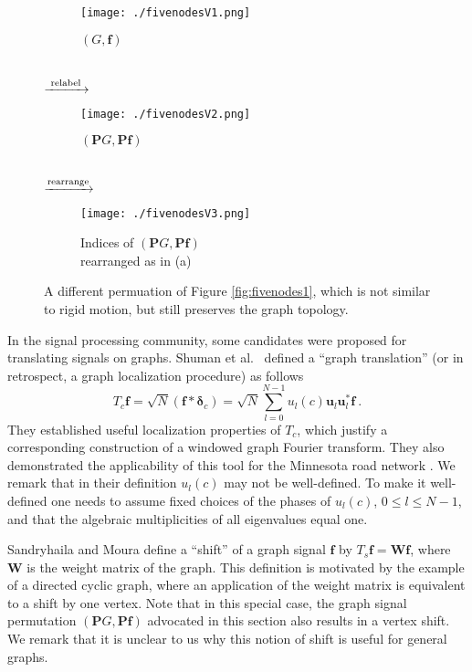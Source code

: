 \documentclass{article}
\def\BP{\boldsymbol{P}}
\def\BW{\boldsymbol{W}}
\def\Bf{\boldsymbol{f}}
\def\Bu{\boldsymbol{u}}
\begin{document}
\begin{figure}[!ht]
\centering
\begin{subfigure}{.25\textwidth}
	\centering
    \texttt{[image: ./fivenodesV1.png]}
    \caption{$(G, \Bf)$ \\ ~ }
\label{fig:fivenodesV1}
\end{subfigure}
{\large$\xrightarrow{\textup{~relabel~}}$}\begin{subfigure}{.25\textwidth}
	\centering
    \texttt{[image: ./fivenodesV2.png]}
    \caption{$(\BP G, \BP \Bf)$ \\ ~ }
\label{fig:fivenodesV2}
\end{subfigure}
{\large$\xrightarrow{\textup{rearrange}}$}\begin{subfigure}{.25\textwidth}
	\centering
    \texttt{[image: ./fivenodesV3.png]}
    \caption{Indices of $(\BP G, \BP \Bf)$ \\ rearranged as in (a)}
\label{fig:fivenodesV3}
\end{subfigure}
\caption{{A different permuation of Figure \ref{fig:fivenodes1}, which is not similar to rigid motion, but still preserves the graph topology.}}
\label{fig:fivenodesV}
\end{figure}


In the signal processing community, {some} candidates were proposed for translating signals on graphs. Shuman et al.~\cite{ShuRV16} {defined a ``graph translation'' (or in retrospect, a graph localization procedure) as follows} 
\begin{equation}\label{eq:defTranslMod}
T_c \Bf = \sqrt{N} (\Bf \ast \boldsymbol{\delta}_c) = \sqrt{N} \sum_{l=0}^{N-1} u_l(c) \Bu_l \Bu_l^* \Bf  ~.
\end{equation}
{They established useful localization properties of $T_c$, which justify a corresponding construction of a windowed graph Fourier transform. They also demonstrated the applicability of this tool for the Minnesota road network \cite[Figure 7]{ShuRV16}. 
We remark that in their definition $u_l(c)$ may not be well-defined. To make it well-defined one needs to assume fixed choices of the phases of $u_l(c)$, $0 \leq l \leq N-1$, and that the algebraic multiplicities of all eigenvalues equal one. }

Sandryhaila and Moura \cite{SanM13} define a ``shift'' of a graph signal $\Bf$ by $T_s \Bf = \BW \Bf$, where $\BW$ is the weight matrix of the graph. This definition is motivated by the example of a directed cyclic graph, where an application of the weight matrix is equivalent to a shift by one vertex. Note that in this special case, the graph signal permutation $(\BP G, \BP \Bf)$ advocated in this section also results in a vertex shift. {We remark that it is unclear to us why this notion of shift is useful for general graphs.}
\end{document}
